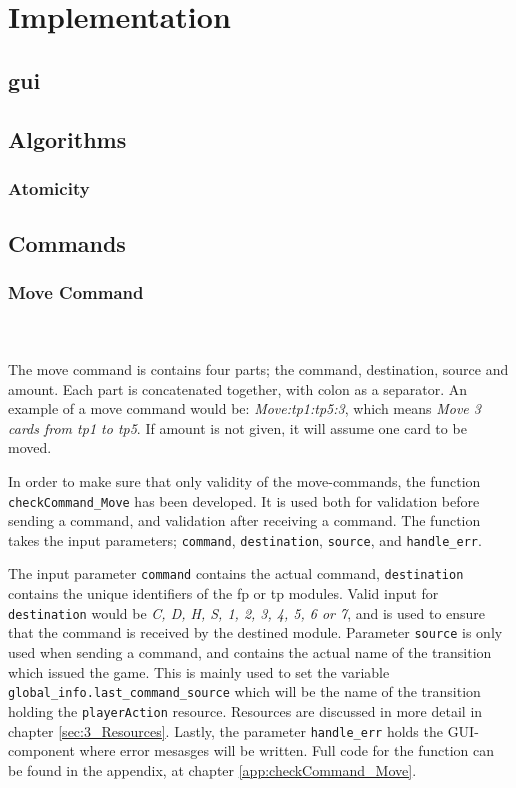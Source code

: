 \documentclass[runningheads,a4paper]{llncs}
\begin{document}
\section{Implementation}
\label{sec:3_implementation}
\subsection{\ac{gui}}
\label{sec:3_gui}
\clearpage
\subsection{Algorithms}
\subsubsection{Atomicity}
\clearpage
\subsection{Commands}
\subsubsection{Move Command}~\\~\\
\label{sec:3_move_command}
The move command is contains four parts; the command, destination, source and amount. Each part is concatenated together, with colon as a separator. An example of a move command would be: \textit{Move:\ac{tp}1:\ac{tp}5:3}, which means \textit{Move 3 cards from \ac{tp}1 to \ac{tp}5}. If amount is not given, it will assume one card to be moved.
\newline

In order to make sure that only validity of the move-commands, the function \verb!checkCommand_Move! has been developed. It is used both for validation before sending a command, and validation after receiving a command. The function takes the input parameters; \verb!command!, \verb!destination!, \verb!source!, and \verb!handle_err!. 
\newline

The input parameter \verb!command! contains the actual command, \verb!destination! contains the unique identifiers of the \ac{fp} or \ac{tp} modules. Valid input for \verb!destination! would be \textit{C, D, H, S, 1, 2, 3, 4, 5, 6 or 7}, and is used to ensure that the command is received by the destined module. Parameter \verb!source! is only used when sending a command, and contains the actual name of the transition which issued the game. This is mainly used to set the variable \verb!global_info.last_command_source! which will be the name of the transition holding the \verb!playerAction! resource. Resources are discussed in more detail in chapter \ref{sec:3_Resources}. Lastly, the parameter \verb!handle_err! holds the GUI-component where error mesasges will be written. Full code for the function can be found in the appendix, at chapter \ref{app:checkCommand_Move}.
\\
\end{document}
